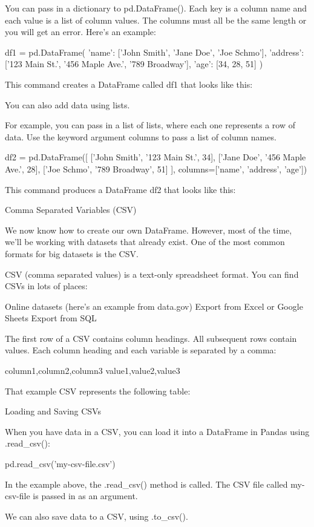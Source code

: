 \documentclass{journal}
\begin{document}
You can pass in a dictionary to pd.DataFrame(). Each key is a column name and each value is a list of column values. The columns must all be the same length or you will get an error. Here’s an example:

df1 = pd.DataFrame({
    'name': ['John Smith', 'Jane Doe', 'Joe Schmo'],
    'address': ['123 Main St.', '456 Maple Ave.', '789 Broadway'],
    'age': [34, 28, 51]
})

This command creates a DataFrame called df1 that looks like this:


You can also add data using lists.

For example, you can pass in a list of lists, where each one represents a row of data. Use the keyword argument columns to pass a list of column names.

df2 = pd.DataFrame([
    ['John Smith', '123 Main St.', 34],
    ['Jane Doe', '456 Maple Ave.', 28],
    ['Joe Schmo', '789 Broadway', 51]
    ],
    columns=['name', 'address', 'age'])

This command produces a DataFrame df2 that looks like this:

Comma Separated Variables (CSV)

We now know how to create our own DataFrame. However, most of the time, we'll be working with datasets that already exist. One of the most common formats for big datasets is the CSV.

CSV (comma separated values) is a text-only spreadsheet format. You can find CSVs in lots of places:

    Online datasets (here's an example from data.gov)
    Export from Excel or Google Sheets
    Export from SQL

The first row of a CSV contains column headings. All subsequent rows contain values. Each column heading and each variable is separated by a comma:

column1,column2,column3
value1,value2,value3

That example CSV represents the following table:

Loading and Saving CSVs

When you have data in a CSV, you can load it into a DataFrame in Pandas using .read_csv():

pd.read_csv('my-csv-file.csv')

In the example above, the .read_csv() method is called. The CSV file called my-csv-file is passed in as an argument.

We can also save data to a CSV, using .to_csv().
\end{document}
